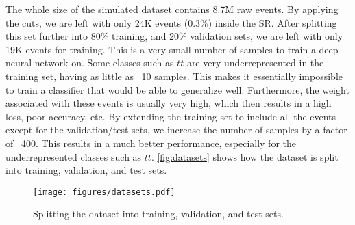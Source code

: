 The whole size of the simulated dataset contains 8.7M raw events. By applying the cuts, we are left with only 24K events
(0.3\%) inside the SR. After splitting this set further into 80\% training, and 20\% validation sets, we are left with
only 19K events for training. This is a very small number of samples to train a deep neural network on. Some classes
such as $t\bar{t}$ are very underrepresented in the training set, having as little as ~10 samples. This makes it
essentially impossible to train a classifier that would be able to generalize well. Furthermore, the weight associated
with these events is usually very high, which then results in a high loss, poor accuracy, etc. By extending the training
set to include all the events except for the validation/test sets, we increase the number of samples by a factor of
~400. This results in a much better performance, especially for the underrepresented classes such as $t\bar{t}$.
\autoref{fig:datasets} shows how the dataset is split into training, validation, and test sets.

\begin{figure}[htbp]
    \centering
    \texttt{[image: figures/datasets.pdf]}
    \caption{Splitting the dataset into training, validation, and test sets.}
    \label{fig:datasets}
\end{figure}
